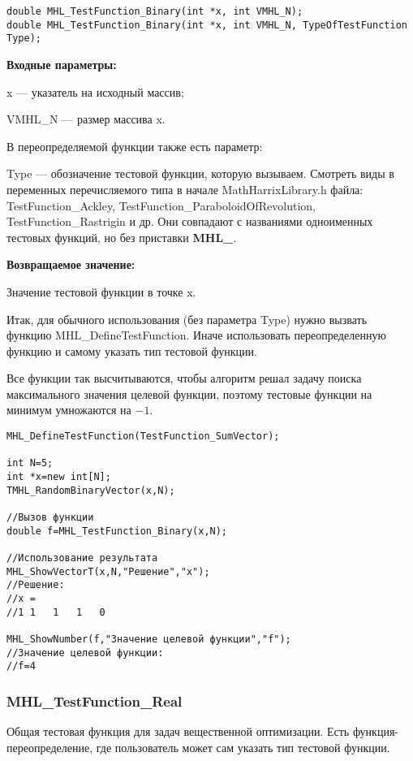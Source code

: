 \documentclass[a4paper,12pt]{article}
\begin{document}
\begin{lstlisting}[label=code_syntax_MHL_TestFunction_Binary,caption=Синтаксис]
double MHL_TestFunction_Binary(int *x, int VMHL_N);
double MHL_TestFunction_Binary(int *x, int VMHL_N, TypeOfTestFunction Type);
\end{lstlisting}

\textbf{Входные параметры:}

x --- указатель на исходный массив;

VMHL\_N --- размер массива x.

В переопределяемой функции также есть параметр:
  
Type --- обозначение тестовой функции, которую вызываем.
Смотреть виды в переменных перечисляемого типа в начале MathHarrixLibrary.h файла: TestFunction\_Ackley, TestFunction\_ParaboloidOfRevolution, TestFunction\_Rastrigin и др. Они совпадают с названиями одноименных тестовых функций, но без приставки \textbf{MHL\_}.

\textbf{Возвращаемое значение:}
 
Значение тестовой функции в точке x.

Итак, для обычного использования (без параметра Type) нужно вызвать функцию MHL\_DefineTestFunction. Иначе использовать переопределенную функцию и самому указать тип тестовой функции.

Все функции так высчитываются, чтобы алгоритм решал задачу поиска максимального значения целевой функции, поэтому тестовые функции на минимум умножаются на $-1$.


\begin{lstlisting}[label=code_use_MHL_TestFunction_Binary,caption=Пример использования]
MHL_DefineTestFunction(TestFunction_SumVector);

int N=5;
int *x=new int[N];
TMHL_RandomBinaryVector(x,N);

//Вызов функции
double f=MHL_TestFunction_Binary(x,N);

//Использование результата
MHL_ShowVectorT(x,N,"Решение","x");
//Решение:
//x =
//1	1	1	1	0

MHL_ShowNumber(f,"Значение целевой функции","f");
//Значение целевой функции:
//f=4
\end{lstlisting}

\subsubsection{MHL\_TestFunction\_Real}\label{MHL_TestFunction_Real}

Общая тестовая функция для задач вещественной оптимизации. Есть функция-переопределение, где пользователь может сам указать тип тестовой функции.
\end{document}
